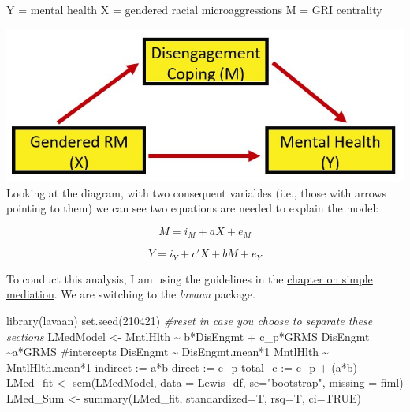 \documentclass[
  english,
]{book}
\newenvironment{Shaded}{\begin{snugshade}}{\end{snugshade}}
\newcommand{\AttributeTok}[1]{\textcolor[rgb]{0.77,0.63,0.00}{#1}}
\newcommand{\CommentTok}[1]{\textcolor[rgb]{0.56,0.35,0.01}{\textit{#1}}}
\newcommand{\ConstantTok}[1]{\textcolor[rgb]{0.00,0.00,0.00}{#1}}
\newcommand{\DecValTok}[1]{\textcolor[rgb]{0.00,0.00,0.81}{#1}}
\newcommand{\FunctionTok}[1]{\textcolor[rgb]{0.00,0.00,0.00}{#1}}
\newcommand{\NormalTok}[1]{#1}
\newcommand{\OtherTok}[1]{\textcolor[rgb]{0.56,0.35,0.01}{#1}}
\newcommand{\StringTok}[1]{\textcolor[rgb]{0.31,0.60,0.02}{#1}}
\begin{document}
Y = mental health
X = gendered racial microaggressions
M = GRI centrality

\includegraphics{images/ModMed/LewisMed.jpg}
Looking at the diagram, with two consequent variables (i.e., those with arrows pointing to them) we can see two equations are needed to explain the model:

\[M = i_{M}+aX + e_{M}\]

\[Y = i_{Y}+c'X+ bM+e_{Y}\]

To conduct this analysis, I am using the guidelines in the \protect\hyperlink{SimpleMed}{chapter on simple mediation}. We are switching to the \emph{lavaan} package.

\begin{Shaded}
\begin{Highlighting}[]
\FunctionTok{library}\NormalTok{(lavaan)}
\FunctionTok{set.seed}\NormalTok{(}\DecValTok{210421}\NormalTok{) }\CommentTok{\#reset in case you choose to separate these sections}
\NormalTok{LMedModel }\OtherTok{\textless{}{-}} \StringTok{\textquotesingle{}}
\StringTok{          MntlHlth \textasciitilde{} b*DisEngmt + c\_p*GRMS }
\StringTok{          DisEngmt \textasciitilde{}a*GRMS}
\StringTok{          }
\StringTok{          \#intercepts}
\StringTok{          DisEngmt \textasciitilde{} DisEngmt.mean*1}
\StringTok{          MntlHlth \textasciitilde{} MntlHlth.mean*1}
\StringTok{          }
\StringTok{          indirect :=  a*b}
\StringTok{          direct  := c\_p}
\StringTok{          total\_c  := c\_p + (a*b)}
\StringTok{          \textquotesingle{}}
\NormalTok{LMed\_fit }\OtherTok{\textless{}{-}} \FunctionTok{sem}\NormalTok{(LMedModel, }\AttributeTok{data =}\NormalTok{ Lewis\_df, }\AttributeTok{se=}\StringTok{"bootstrap"}\NormalTok{, }\AttributeTok{missing =} \StringTok{\textquotesingle{}fiml\textquotesingle{}}\NormalTok{)}
\NormalTok{LMed\_Sum }\OtherTok{\textless{}{-}}  \FunctionTok{summary}\NormalTok{(LMed\_fit, }\AttributeTok{standardized=}\NormalTok{T, }\AttributeTok{rsq=}\NormalTok{T, }\AttributeTok{ci=}\ConstantTok{TRUE}\NormalTok{)}
\end{Highlighting}
\end{Shaded}
\end{document}
